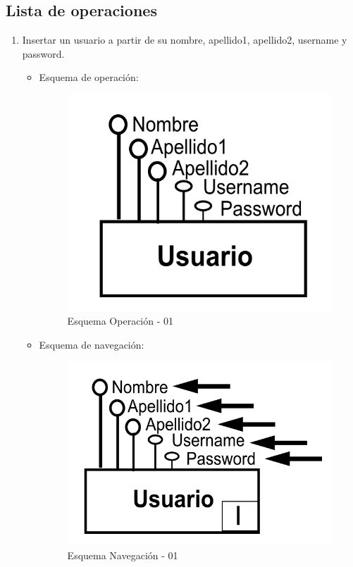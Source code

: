 \documentclass[a4paper,12pt]{report}
\begin{document}
\subsection{Lista de operaciones}
\label{sec-7-8-1}
\begin{enumerate}
\item Insertar un usuario a partir de su nombre, apellido1, apellido2,
username y password.
\begin{itemize}
\item Esquema de operación:
\begin{figure}[!htp]
\centering
\includegraphics[width=0.4\linewidth]{./operaciones/img/Usuarios/01_ope.png}
\caption{Esquema Operación - 01}
\label{fig:ope01}
\medskip
\footnotesize
{}
\end{figure}
\item Esquema de navegación:
\begin{figure}[!htp]
\centering
\includegraphics[width=0.4\linewidth]{./operaciones/img/Usuarios/01_nav.png}
\caption{Esquema Navegación - 01}
\label{fig:nave01}
\medskip
\footnotesize
{}
\end{figure}
\end{itemize}


\end{enumerate}
\end{document}
